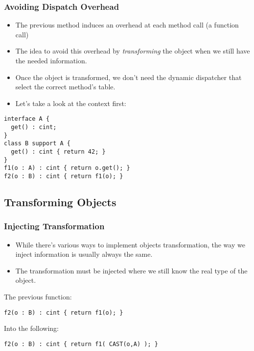 \documentclass{beamer}
\begin{document}
\begin{frame}[fragile]
  \frametitle{Avoiding Dispatch Overhead}
  \begin{itemize}
  \item The previous method induces an overhead at each method call (a
    function call)
  \item The idea to avoid this overhead by \emph{transforming} the object when
    we still have the needed information.
  \item Once the object is transformed, we don't need the dynamic dispatcher
    that select the correct method's table.
  \item Let's take a look at the context first:
  \end{itemize}
  \begin{BoxedExample}
    \footnotesize
\begin{lstlisting}
interface A {
  get() : cint;
}
class B support A {
  get() : cint { return 42; }
}
f1(o : A) : cint { return o.get(); }
f2(o : B) : cint { return f1(o); }
\end{lstlisting}

  \end{BoxedExample}
\end{frame}

\subsection{Transforming Objects}

\begin{frame}[fragile]
  \frametitle{Injecting Transformation}
  \begin{itemize}
  \item While there's various ways to implement objects transformation, the
    way we inject information is usually always the same.
  \item The transformation must be injected where we still know the real
    type of the object.
  \end{itemize}
  \begin{BoxedExample}
    The previous function:
    {\footnotesize
\begin{lstlisting}
f2(o : B) : cint { return f1(o); }
\end{lstlisting}
    }

    Into the following:

    {\footnotesize
\begin{lstlisting}
f2(o : B) : cint { return f1( CAST(o,A) ); }
\end{lstlisting}
    }
  \end{BoxedExample}
\end{frame}
\end{document}
